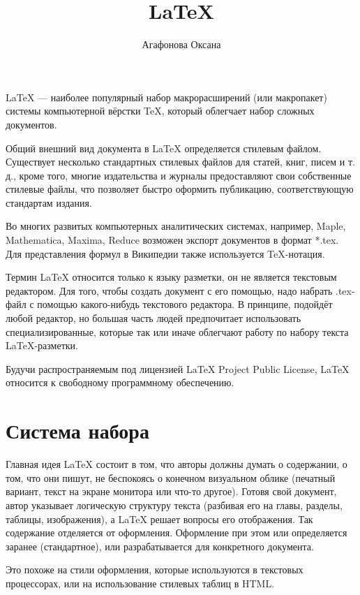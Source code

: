 \documentclass[10pt,a4paper]{article}
\author{Агафонова Оксана}
\title{LaTeX}
\begin{document}
\maketitle
\clearpage
\LaTeX{} --- наиболее популярный набор макрорасширений (или макропакет) системы компьютерной вёрстки \TeX{}, который облегчает набор сложных документов. 

Общий внешний вид документа в LaTeX определяется стилевым файлом. Существует несколько стандартных стилевых файлов для статей, книг, писем и т. д., кроме того, многие издательства и журналы предоставляют свои собственные стилевые файлы, что позволяет быстро оформить публикацию, соответствующую стандартам издания.

Во многих развитых компьютерных аналитических системах, например, Maple, Mathematica, Maxima, Reduce возможен экспорт документов в формат *.tex. Для представления формул в Википедии также используется TeX-нотация.

Термин LaTeX относится только к языку разметки, он не является текстовым редактором. Для того, чтобы создать документ с его помощью, надо набрать .tex-файл с помощью какого-нибудь текстового редактора. В принципе, подойдёт любой редактор, но большая часть людей предпочитает использовать специализированные, которые так или иначе облегчают работу по набору текста LaTeX-разметки.

Будучи распространяемым под лицензией LaTeX Project Public License, LaTeX относится к свободному программному обеспечению.
\clearpage
\tableofcontents
\clearpage

\section{Система набора}
\hspace{0,6cm}Главная идея \LaTeX{} состоит в том, что авторы должны думать о содержании, о том, что они пишут, не беспокоясь о конечном визуальном облике (печатный вариант, текст на экране монитора или что-то другое). Готовя свой документ, автор указывает логическую структуру текста (разбивая его на главы, разделы, таблицы, изображения), а LaTeX решает вопросы его отображения. Так содержание отделяется от оформления. Оформление при этом или определяется заранее (стандартное), или разрабатывается для конкретного документа.

Это похоже на стили оформления, которые используются в текстовых процессорах, или на использование стилевых таблиц в HTML.
\end{document}
